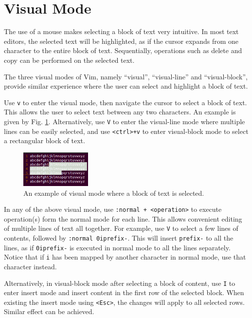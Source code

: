 \section{Visual Mode}

The use of a mouse makes selecting a block of text very intuitive. In most text editors, the selected text will be highlighted, as if the cursor expands from one character to the entire block of text. Sequentially, operations such as delete and copy can be performed on the selected text.

The three visual modes of Vim, namely ``visual'', ``visual-line'' and ``visual-block'', provide similar experience where the user can select and highlight a block of text.

Use \verb|v| to enter the visual mode, then navigate the cursor to select a block of text. This allows the user to select text between any two characters. An example is given by Fig. \ref{ch:tfe:fig:vimvm1}. Alternatively, use \verb|V| to enter the visual-line mode where multiple lines can be easily selected, and use \verb|<ctrl>+v| to enter visual-block mode to select a rectangular block of text.

\begin{figure}[htbp]
	\centering
	\includegraphics[width=100pt]{chapters/part-1/figures/vimvm1.png}
	\caption{An example of visual mode where a block of text is selected.} \label{ch:tfe:fig:vimvm1}
\end{figure}

In any of the above visual mode, use \verb|:normal + <operation>| to execute operation(s) form the normal mode for each line. This allows convenient editing of multiple lines of text all together. For example, use \verb|V| to select a few lines of contents, followed by \verb|:normal 0iprefix-|. This will insert \verb|prefix-| to all the lines, as if \verb|0iprefix-| is executed in normal mode to all the lines separately. Notice that if \verb|i| has been mapped by another character in normal mode, use that character instead.

Alternatively, in visual-block mode after selecting a block of content, use \verb|I| to enter insert mode and insert content in the first row of the selected block. When existing the insert mode using \verb|<Esc>|, the changes will apply to all selected rows. Similar effect can be achieved.

